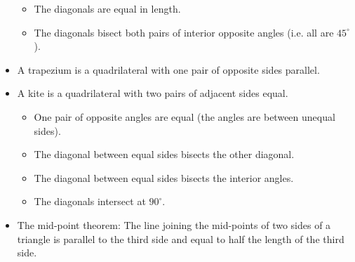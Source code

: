\begin{itemize}[noitemsep]
\begin{itemize}[noitemsep]
  \item The diagonals are equal in length.
  \item The diagonals bisect both pairs of interior opposite angles
    (i.e. all are $45^\circ$).
  \end{itemize}
\item A trapezium is a quadrilateral with one pair of opposite sides parallel.
\item A kite is a quadrilateral with two pairs of adjacent sides equal.
  \begin{itemize}[noitemsep]
  \item One pair of opposite angles are equal (the angles are between unequal sides).
  \item The diagonal between equal sides bisects the other diagonal.
  \item The diagonal between equal sides bisects the interior angles.
  \item The diagonals intersect at $90^\circ$.
  \end{itemize}
\item The mid-point theorem: The line joining the mid-points of two
  sides of a triangle is parallel to the third side and equal to half
  the length of the third side.
\end{itemize}

